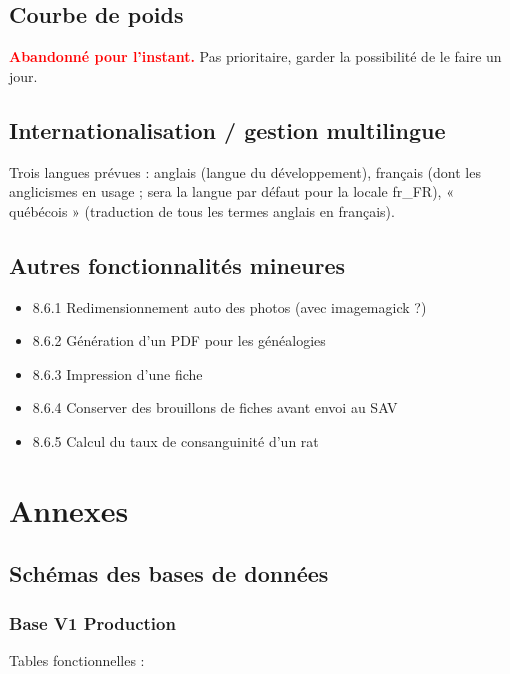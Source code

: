 \documentclass[a4paper,10pt]{article}
\newcommand\desire[1]{\noindent\textbf{\textcolor{red}{#1}}}
\begin{document}
\subsection{Courbe de poids}
\desire{Abandonné pour l'instant.} Pas prioritaire, garder la possibilité de le faire un jour.

\subsection{Internationalisation / gestion multilingue}
Trois langues prévues : anglais (langue du développement), français (dont les anglicismes en usage ; sera la langue par défaut pour la locale fr\_FR), « québécois » (traduction de tous les termes anglais en français).  

\subsection{Autres fonctionnalités mineures}
\begin{itemize}
\item 8.6.1 Redimensionnement auto des photos (avec imagemagick ?)
\item 8.6.2 Génération d'un PDF pour les généalogies
\item 8.6.3 Impression d'une fiche
\item 8.6.4 Conserver des brouillons de fiches avant envoi au SAV
\item 8.6.5 Calcul du taux de consanguinité d'un rat
\end{itemize}

\newpage
\appendix
\setlength{\parskip}{0pt}
\section{Annexes}

\subsection{Schémas des bases de données}

\subsubsection{Base V1 Production}
\label{app:dbv1}
Tables fonctionnelles :
\end{document}
